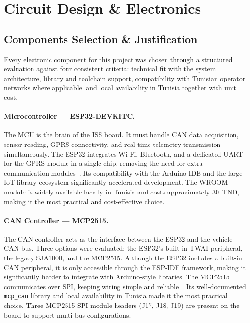 \section{Circuit Design \& Electronics}

\subsection{Components Selection \& Justification}

Every electronic component for this project was chosen through a structured evaluation against four consistent criteria: technical fit with the system architecture, library and toolchain support, compatibility with Tunisian operator networks where applicable, and local availability in Tunisia together with unit cost.

\paragraph{Microcontroller --- ESP32-DEVKITC.}
The MCU is the brain of the ISS board. It must handle CAN data acquisition, sensor reading, GPRS connectivity, and real-time telemetry transmission simultaneously. The ESP32 integrates Wi-Fi, Bluetooth, and a dedicated UART for the GPRS module in a single chip, removing the need for extra communication modules~\cite{esp32datasheet}. Its compatibility with the Arduino IDE and the large IoT library ecosystem significantly accelerated development. The WROOM module is widely available locally in Tunisia and costs approximately 30~TND, making it the most practical and cost-effective choice.

\paragraph{CAN Controller --- MCP2515.}
The CAN controller acts as the interface between the ESP32 and the vehicle CAN bus. Three options were evaluated: the ESP32's built-in TWAI peripheral, the legacy SJA1000, and the MCP2515. Although the ESP32 includes a built-in CAN peripheral, it is only accessible through the ESP-IDF framework, making it significantly harder to integrate with Arduino-style libraries. The MCP2515 communicates over SPI, keeping wiring simple and reliable~\cite{mcp2515datasheet}. Its well-documented \texttt{mcp\_can} library and local availability in Tunisia made it the most practical choice. Three MCP2515 SPI module headers (J17, J18, J19) are present on the board to support multi-bus configurations.

